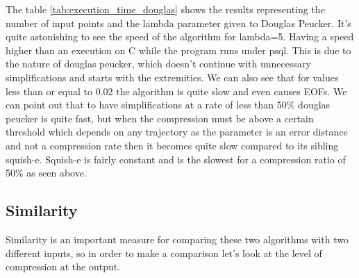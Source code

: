 The table \ref{tab:execution_time_douglas} shows the results representing the number of input points and the lambda parameter given to Douglas Peucker. 
It's quite astonishing to see the speed of the algorithm for lambda=5. Having a speed higher than an execution on C while the program runs under psql.  This is due to the nature of douglas peucker, which doesn't continue with unnecessary simplifications and starts with the extremities. We can also see that for values less than or equal to 0.02 the algorithm is quite slow and even causes EOFs. We can point out that to have simplifications at a rate of less than 50\% douglas peucker is quite fast, but when the compression must be above a certain threshold which depends on any trajectory as the parameter is an error distance and not a compression rate then it becomes quite slow compared to its sibling squish-e.  Squish-e is fairly constant and is the slowest for a compression ratio of 50\% as seen above.

\subsection{Similarity}
Similarity is an important measure for comparing these two algorithms with two different inputs, so in order to make a comparison let's look at the level of compression at the output. 


